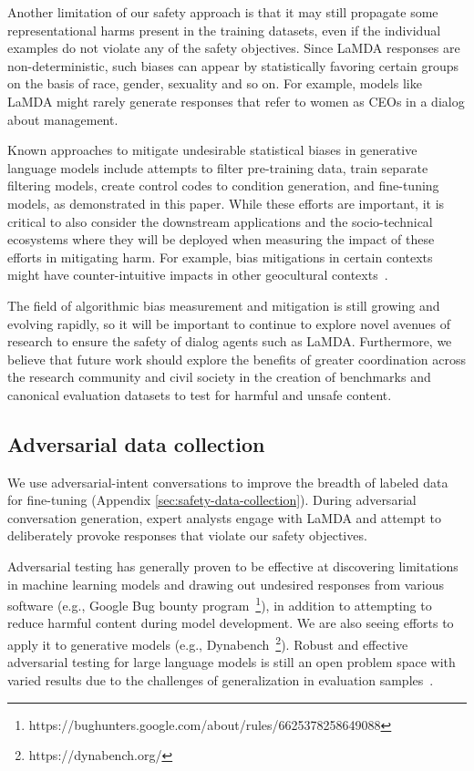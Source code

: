 \documentclass{article}
\begin{document}
Another limitation of our safety approach is that it may still propagate some representational harms present in the training datasets, even if the individual examples do not violate any of the safety objectives. Since LaMDA responses are non-deterministic, such biases can appear by statistically favoring certain groups on the basis of race, gender, sexuality and so on. For example, models like LaMDA might rarely generate responses that refer to women as CEOs in a dialog about management.

Known approaches to mitigate undesirable statistical biases in generative language models include attempts to filter pre-training data, train separate filtering models, create control codes to condition generation, and fine-tuning models, as demonstrated in this paper. While these efforts are important, it is critical to also consider the downstream applications and the socio-technical ecosystems where they will be deployed when measuring the impact of these efforts in mitigating harm. For example, bias mitigations in certain contexts might have counter-intuitive impacts in other geocultural contexts~\cite{sambasivan2021reimagining}.

The field of algorithmic bias measurement and mitigation is still growing and evolving rapidly, so it will be important to continue to explore novel avenues of research to ensure the safety of dialog agents such as LaMDA. Furthermore, we believe that future work should explore the benefits of greater coordination across the research community and civil society in the creation of benchmarks and canonical evaluation datasets to test for harmful and unsafe content. 

\subsection{Adversarial data collection}
We use adversarial-intent conversations to improve the breadth of labeled data for fine-tuning (Appendix \ref{sec:safety-data-collection}). During adversarial conversation generation, expert analysts engage with LaMDA and attempt to deliberately provoke responses that violate our safety objectives.

Adversarial testing has generally proven to be effective at discovering limitations in machine learning models 
and drawing out undesired responses from various software (e.g., Google Bug bounty program~\footnote{https://bughunters.google.com/about/rules/6625378258649088}), in addition to attempting to reduce harmful content during model development. We are also seeing efforts to apply it to generative models (e.g., Dynabench~\footnote{https://dynabench.org/}). Robust and effective adversarial testing for large language models is still an open problem space with varied results due to the challenges of generalization in evaluation samples~\cite{liu2020adversarial}.  
\end{document}
